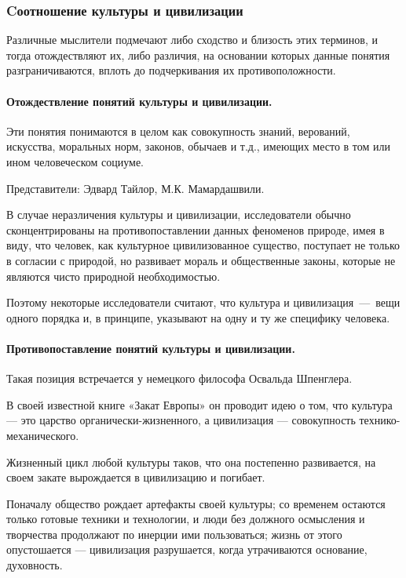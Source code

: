 \subsubsection{Cоотношение культуры и цивилизации}
Различные мыслители подмечают либо сходство и близость этих терминов, и
тогда отождествляют их, либо различия, на основании которых данные понятия
разграничиваются, вплоть до подчеркивания их противоположности. 

\paragraph{Отождествление понятий культуры и цивилизации.} 

Эти понятия понимаются в целом как совокупность знаний, верований, искусства,
моральных норм, законов, обычаев и т.д., имеющих место в том или ином
человеческом социуме. 

Представители: Эдвард Тайлор, М.К. Мамардашвили. 

В случае неразличения культуры и цивилизации, исследователи обычно
сконцентрированы на противопоставлении данных феноменов природе, имея в виду,
что человек, как культурное цивилизованное существо, поступает не только в согласии 
с природой, но развивает мораль и
общественные законы, которые не являются чисто природной необходимостью. 

Поэтому некоторые исследователи считают, что культура и цивилизация~---~вещи одного
порядка и, в принципе, указывают на одну и ту же специфику человека.

\paragraph{Противопоставление понятий культуры и цивилизации.}

Такая позиция встречается у немецкого философа Освальда Шпенглера. 

В своей известной книге «Закат Европы» он
проводит идею о том, что культура — это царство органически-жизненного, а
цивилизация — совокупность технико-механического. 

Жизненный цикл любой
культуры таков, что она постепенно развивается, на своем закате вырождается в
цивилизацию и погибает. 

Поначалу общество рождает артефакты своей культуры; со временем остаются только готовые техники и технологии, и люди без должного осмысления и творчества
продолжают по инерции ими пользоваться; жизнь от этого опустошается --- цивилизация разрушается, когда утрачиваются основание, духовность. 

